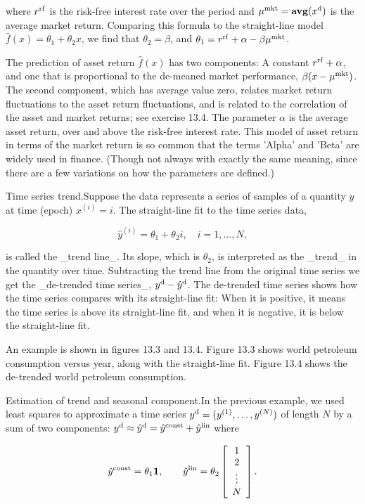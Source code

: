 where \(r^{\rm rf}\) is the risk-free interest rate over the period and \(\mu^{\rm mkt}={\bf avg}(x^{\rm d})\) is the average market return. Comparing this formula to the straight-line model \(\hat{f}(x)=\theta_{1}+\theta_{2}x\), we find that \(\theta_{2}=\beta\), and \(\theta_{1}=r^{\rm rf}+\alpha-\beta\mu^{\rm mkt}\).

The prediction of asset return \(\hat{f}(x)\) has two components: A constant \(r^{\rm rf}+\alpha\), and one that is proportional to the de-meaned market performance, \(\beta(x-\mu^{\rm mkt})\). The second component, which has average value zero, relates market return fluctuations to the asset return fluctuations, and is related to the correlation of the asset and market returns; see exercise 13.4. The parameter \(\alpha\) is the average asset return, over and above the risk-free interest rate. This model of asset return in terms of the market return is so common that the terms 'Alpha' and 'Beta' are widely used in finance. (Though not always with exactly the same meaning, since there are a few variations on how the parameters are defined.)

Time series trend.Suppose the data represents a series of samples of a quantity \(y\) at time (epoch) \(x^{(i)}=i\). The straight-line fit to the time series data,

\[\hat{y}^{(i)}=\theta_{1}+\theta_{2}i,\quad i=1,\ldots,N,\]

is called the _trend line_. Its slope, which is \(\theta_{2}\), is interpreted as the _trend_ in the quantity over time. Subtracting the trend line from the original time series we get the _de-trended time series_, \(y^{\rm d}-\hat{y}^{\rm d}\). The de-trended time series shows how the time series compares with its straight-line fit: When it is positive, it means the time series is above its straight-line fit, and when it is negative, it is below the straight-line fit.

An example is shown in figures 13.3 and 13.4. Figure 13.3 shows world petroleum consumption versus year, along with the straight-line fit. Figure 13.4 shows the de-trended world petroleum consumption.

Estimation of trend and seasonal component.In the previous example, we used least squares to approximate a time series \(y^{\rm d}=(y^{(1)},\ldots,y^{(N)})\) of length \(N\) by a sum of two components: \(y^{\rm d}\approx\hat{y}^{\rm d}=\hat{y}^{\rm const}+\hat{y}^{\rm lin}\) where

\[\hat{y}^{\rm const}=\theta_{1}{\bf 1},\qquad\hat{y}^{\rm lin}=\theta_{2} \left[\begin{array}{c}1\\ 2\\ \vdots\\ N\end{array}\right].\]

